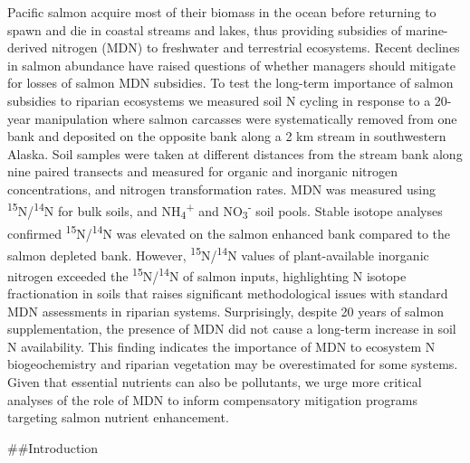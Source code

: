 \documentclass [11pt, proquest] {uwthesis}[2015/03/03]
\begin{document}
Pacific salmon acquire most of their biomass in the ocean before returning to spawn and die in coastal streams and lakes, thus providing subsidies of marine-derived nitrogen (MDN) to freshwater and terrestrial ecosystems. Recent declines in salmon abundance have raised questions of whether managers should mitigate for losses of salmon MDN subsidies. To test the long-term importance of salmon subsidies to riparian ecosystems we measured soil N cycling in response to a 20-year manipulation where salmon carcasses were systematically removed from one bank and deposited on the opposite bank along a 2 km stream in southwestern Alaska. Soil samples were taken at different distances from the stream bank along nine paired transects and measured for organic and inorganic nitrogen concentrations, and nitrogen transformation rates. MDN was measured using \textsuperscript{15}N/\textsuperscript{14}N for bulk soils, and NH\textsubscript{4}\textsuperscript{+} and NO\textsubscript{3}\textsuperscript{-} soil pools. Stable isotope analyses confirmed \textsuperscript{15}N/\textsuperscript{14}N was elevated on the salmon enhanced bank compared to the salmon depleted bank. However, \textsuperscript{15}N/\textsuperscript{14}N values of plant-available inorganic nitrogen exceeded the \textsuperscript{15}N/\textsuperscript{14}N of salmon inputs, highlighting N isotope fractionation in soils that raises significant methodological issues with standard MDN assessments in riparian systems. Surprisingly, despite 20 years of salmon supplementation, the presence of MDN did not cause a long-term increase in soil N availability. This finding indicates the importance of MDN to ecosystem N biogeochemistry and riparian vegetation may be overestimated for some systems. Given that essential nutrients can also be pollutants, we urge more critical analyses of the role of MDN to inform compensatory mitigation programs targeting salmon nutrient enhancement.

\#\#Introduction
\end{document}
